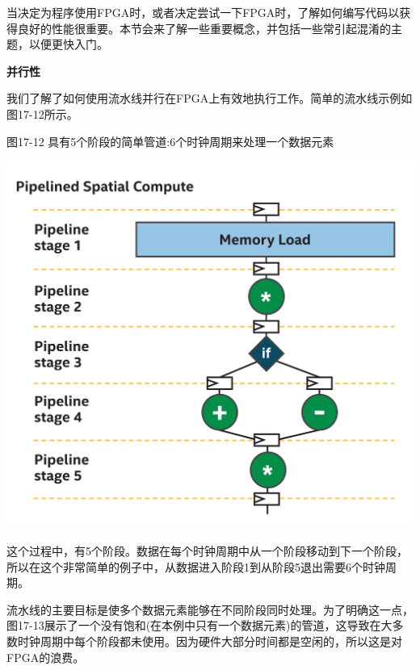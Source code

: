 当决定为程序使用FPGA时，或者决定尝试一下FPGA时，了解如何编写代码以获得良好的性能很重要。本节会来了解一些重要概念，并包括一些常引起混淆的主题，以便更快入门。\par

\hspace*{\fill} \par %
\textbf{并行性}

我们了解了如何使用流水线并行在FPGA上有效地执行工作。简单的流水线示例如图17-12所示。\par

\hspace*{\fill} \par %
图17-12 具有5个阶段的简单管道:6个时钟周期来处理一个数据元素
\begin{center}
	\includegraphics[width=1.0\textwidth]{content/chapter-17/images/11}
\end{center}

这个过程中，有5个阶段。数据在每个时钟周期中从一个阶段移动到下一个阶段，所以在这个非常简单的例子中，从数据进入阶段1到从阶段5退出需要6个时钟周期。\par

流水线的主要目标是使多个数据元素能够在不同阶段同时处理。为了明确这一点，图17-13展示了一个没有饱和(在本例中只有一个数据元素)的管道，这导致在大多数时钟周期中每个阶段都未使用。因为硬件大部分时间都是空闲的，所以这是对FPGA的浪费。\par

